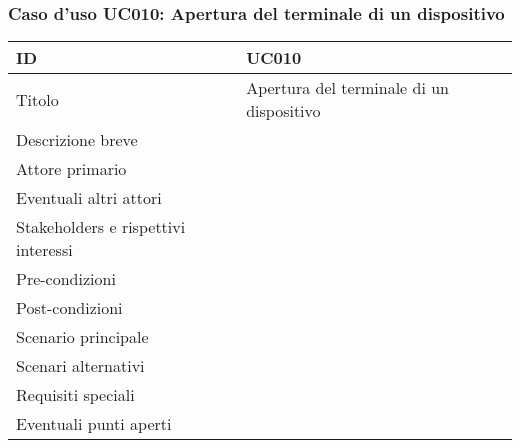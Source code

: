 \documentclass[../../main.tex]{subfiles}
\begin{document}
\subsubsection{Caso d’uso UC010: Apertura del terminale di un dispositivo }
\begin{tabularx}{150mm}{|l|X|}
    \hline
    ID                                  & \textbf{UC010}\\
    \hline
    Titolo                              & Apertura del terminale di un dispositivo \\
    \hline
    Descrizione breve                   &    \\
    \hline
    Attore primario                     &    \\
    \hline
    Eventuali altri attori              &    \\
    \hline
    Stakeholders e rispettivi interessi &    \\
    \hline
    Pre-condizioni                      &    \\
    \hline
    Post-condizioni                     &    \\
    \hline
    Scenario principale                 &    \\
    \hline
    Scenari alternativi                 &    \\
    \hline
    Requisiti speciali                  &    \\
    \hline
    Eventuali punti aperti              &    \\
    \hline
\end{tabularx}
\newpage
\end{document}
